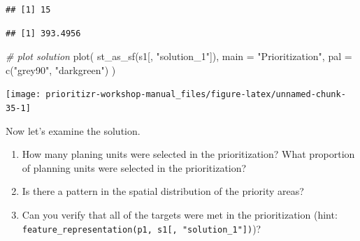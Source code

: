 \documentclass[
  12pt,
]{book}
\makeatletter
\newenvironment{Shaded}{\begin{snugshade}}{\end{snugshade}}
\newcommand{\AttributeTok}[1]{\textcolor[rgb]{0.77,0.63,0.00}{#1}}
\newcommand{\CommentTok}[1]{\textcolor[rgb]{0.56,0.35,0.01}{\textit{#1}}}
\newcommand{\FunctionTok}[1]{\textcolor[rgb]{0.00,0.00,0.00}{#1}}
\newcommand{\NormalTok}[1]{#1}
\newcommand{\SpecialCharTok}[1]{\textcolor[rgb]{0.00,0.00,0.00}{#1}}
\newcommand{\StringTok}[1]{\textcolor[rgb]{0.31,0.60,0.02}{#1}}
\providecommand{\tightlist}{%
  \setlength{\itemsep}{0pt}\setlength{\parskip}{0pt}}
\newenvironment{kframe}{%
\medskip{}
\setlength{\fboxsep}{.8em}
 \def\at@end@of@kframe{}%
 \ifinner\ifhmode%
  \def\at@end@of@kframe{\end{minipage}}%
  \begin{minipage}{\columnwidth}%
 \fi\fi%
 \def\FrameCommand##1{\hskip\@totalleftmargin \hskip-\fboxsep
 \colorbox{shadecolor}{##1}\hskip-\fboxsep
     \hskip-\linewidth \hskip-\@totalleftmargin \hskip\columnwidth}%
 \MakeFramed {\advance\hsize-\width
   \@totalleftmargin\z@ \linewidth\hsize
   \@setminipage}}%
 {\par\unskip\endMakeFramed%
 \at@end@of@kframe}
\newenvironment{rmdblock}[1]
  {
  \begin{itemize}
  \renewcommand{\labelitemi}{
    \raisebox{-.7\height}[0pt][0pt]{
      {\setkeys{Gin}{width=3em,keepaspectratio}\texttt{[image: images/\#1]}}
    }
  }
  \setlength{\fboxsep}{1em}
  \begin{kframe}
  \item
  }
  {
  \end{kframe}
  \end{itemize}
  }
\newenvironment{rmdquestion}
  {\begin{rmdblock}{question}}
  {\end{rmdblock}}
\makeatother
\begin{document}
\begin{Shaded}
\end{Shaded}

\begin{verbatim}
## [1] 15
\end{verbatim}

\begin{Shaded}
\end{Shaded}

\begin{verbatim}
## [1] 393.4956
\end{verbatim}

\begin{Shaded}
\begin{Highlighting}[]
\CommentTok{\# plot solution}
\FunctionTok{plot}\NormalTok{(}
  \FunctionTok{st\_as\_sf}\NormalTok{(s1[, }\StringTok{"solution\_1"}\NormalTok{]), }\AttributeTok{main =} \StringTok{"Prioritization"}\NormalTok{,}
  \AttributeTok{pal =} \FunctionTok{c}\NormalTok{(}\StringTok{"grey90"}\NormalTok{, }\StringTok{"darkgreen"}\NormalTok{)}
\NormalTok{)}
\end{Highlighting}
\end{Shaded}

\begin{center}\texttt{[image: prioritizr-workshop-manual\_files/figure-latex/unnamed-chunk-35-1]} \end{center}

Now let's examine the solution.

\begin{rmdquestion}
\begin{enumerate}
\def\labelenumi{\arabic{enumi}.}
\tightlist
\item
  How many planing units were selected in the prioritization? What proportion of planning units were selected in the prioritization?
\item
  Is there a pattern in the spatial distribution of the priority areas?
\item
  Can you verify that all of the targets were met in the prioritization (hint: \texttt{feature\_representation(p1,\ s1{[},\ "solution\_1"{]})})?
\end{enumerate}
\end{rmdquestion}
\end{document}
